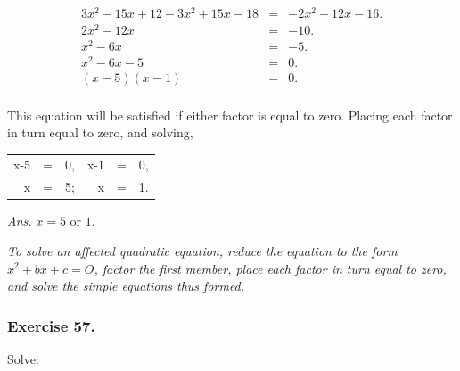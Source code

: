 \documentclass{book}
\begin{document}
\begin{eqnarray*}
3x^2-15x+12-3x^2+15x-18 & = & -2x^2+12x-16. \\
2x^2-12x & = & -10. \\
x^2-6x & = & -5. \\
x^2-6x-5 & = & 0. \\
(x-5)(x-1) & = & 0. \\
\end{eqnarray*}

This equation will be satisfied if either factor is equal
to zero. Placing each factor in turn equal to zero, and
solving,

\begin{tabular}{rclrcl}
x-5 & = & 0, & x-1 & = & 0, \\
x   & = & 5; & x   & = & 1. \\
\end{tabular}

\textit{ Ans.} $x=5$ or $1$.

\textit{ To solve an affected quadratic equation, reduce the
equation to the form $x^2 + bx + c = O$, factor the first member,
place each factor in turn equal to zero, and solve the simple
equations thus formed.}

\subsubsection*{Exercise 57.}

Solve:
\end{document}

